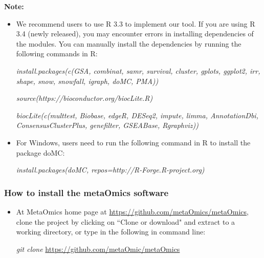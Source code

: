 {\bf Note:}
\begin{itemize}
\item We recommend users to use R 3.3 to implement our tool. If you are using R 3.4 (newly released), you may encounter errors in installing dependencies of the modules. You can manually install the dependencies by running the following commands in R:

\textit{install.packages(c(\textquotesingle GSA\textquotesingle, \textquotesingle combinat\textquotesingle, \textquotesingle   samr\textquotesingle   , \textquotesingle   survival\textquotesingle   , \textquotesingle   cluster\textquotesingle   , \textquotesingle   gplots\textquotesingle   , 
  \textquotesingle   ggplot2\textquotesingle   , \textquotesingle   irr\textquotesingle   , \textquotesingle   shape\textquotesingle   , \textquotesingle   snow\textquotesingle   , \textquotesingle   snowfall\textquotesingle   , \textquotesingle   igraph\textquotesingle   , \textquotesingle   doMC\textquotesingle   , \textquotesingle   PMA\textquotesingle   ))
  }

\textit{source(\textquotesingle   https://bioconductor.org/biocLite.R\textquotesingle   )  }

\textit{biocLite(c(\textquotesingle   multtest\textquotesingle   , \textquotesingle   Biobase\textquotesingle   , \textquotesingle   edgeR\textquotesingle   , \textquotesingle   DESeq2\textquotesingle   , \textquotesingle   impute\textquotesingle   , 
  \textquotesingle   limma\textquotesingle   , \textquotesingle   AnnotationDbi\textquotesingle   , \textquotesingle   ConsensusClusterPlus\textquotesingle   , \textquotesingle   genefilter\textquotesingle   , \textquotesingle   GSEABase\textquotesingle   , \textquotesingle   Rgraphviz\textquotesingle   ))
  }

\item For Windows, users need to run the following command in R to install the package \textquotesingle doMC\textquotesingle:

\textit{install.packages(\textquotesingle doMC\textquotesingle, repos=\textquotesingle http://R-Forge.R-project.org\textquotesingle)}

\end{itemize}

 

\subsubsection{How to install the metaOmics software}
\begin{itemize}
\item At MetaOmics home page at \url{https://github.com/metaOmics/metaOmics}, clone the project by
clicking on ``Clone or download" and extract to a working directory, 
or type in the following in command line:

\textit{git clone} \url{https://github.com/metaOmic/metaOmics}
\end{itemize}


